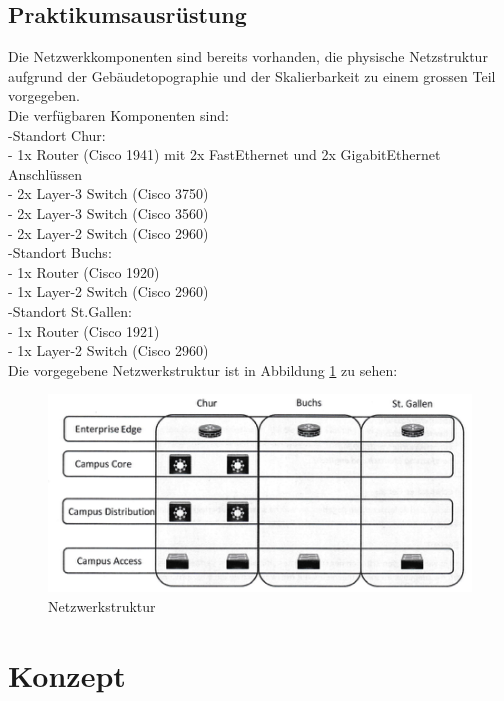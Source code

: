 \documentclass[12pt,a4paper,titlepage]{article}
\begin{document}
\subsection{Praktikumsausrüstung} 
Die Netzwerkkomponenten sind bereits vorhanden, die physische Netzstruktur aufgrund der Gebäudetopographie und der Skalierbarkeit zu einem grossen Teil vorgegeben.\\
\newline
Die verfügbaren Komponenten sind:\\
\newline
-Standort Chur:\\
- 1x Router (Cisco 1941) mit 2x FastEthernet und 2x GigabitEthernet Anschlüssen\\
- 2x Layer-3 Switch (Cisco 3750)\\
- 2x Layer-3 Switch (Cisco 3560)\\
- 2x Layer-2 Switch (Cisco 2960)\\
\newline
-Standort Buchs:\\
- 1x Router (Cisco 1920)\\
- 1x Layer-2 Switch (Cisco 2960)\\
\newline
-Standort St.Gallen:\\
- 1x Router (Cisco 1921)\\
- 1x Layer-2 Switch (Cisco 2960)\\
\newline
Die vorgegebene Netzwerkstruktur ist in Abbildung \ref{abb: Netzwerksturktur} zu sehen:
\begin{figure} [H]
\centering
\includegraphics{Netzwerkstruktur.png}
\caption{Netzwerkstruktur}
\label{abb: Netzwerksturktur}
\end{figure}
\newpage

\section{Konzept}
\end{document}
